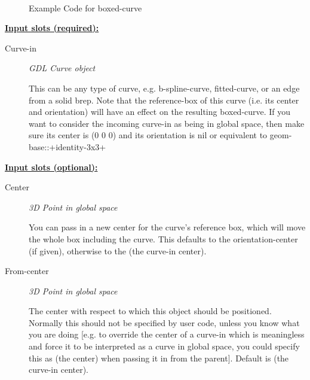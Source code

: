 \documentclass [11pt]{book}
\begin{document}
\begin{itemize}
\begin{figure}
\begin{lrbox}{\boxedverb}
\begin{minipage}{\linewidth}
{\begin{verbatim}
 
\end{verbatim}}
\end{minipage}
\end{lrbox}
\fbox{\usebox{\boxedverb}}

\caption{Example Code for boxed-curve}

\label{fig:example-code-boxed-curve}

\end{figure}





\textbf{
\underline{Input slots (required):}}

\begin{description}

\item [Curve-in]
\emph{GDL Curve object}

 This can be any type of curve, e.g. b-spline-curve, fitted-curve, or an edge from a solid brep.
Note that the reference-box of this curve (i.e. its center and orientation) will have an effect on the resulting
boxed-curve. If you want to consider the incoming curve-in as being in global space, then make sure its center
is (0 0 0) and its orientation is nil or equivalent to geom-base::+identity-3x3+




\end{description}






\textbf{
\underline{Input slots (optional):}}

\begin{description}

\item [Center]
\emph{3D Point in global space}

 You can pass in a new center for the curve's reference box,
which will move the whole box including the curve. This defaults to the
orientation-center (if given), otherwise to the (the curve-in center).




\item [From-center]
\emph{3D Point in global space}

 The center with respect to which this object should be positioned. Normally
this should not be specified by user code, unless you know what you are doing [e.g. to override the center
of a curve-in which is meaningless and force it to be interpreted as a curve in global space, you could
specify this as (the center) when passing it in from the parent].
Default is (the curve-in center).





\end{description}
\end{itemize}
\end{document}
